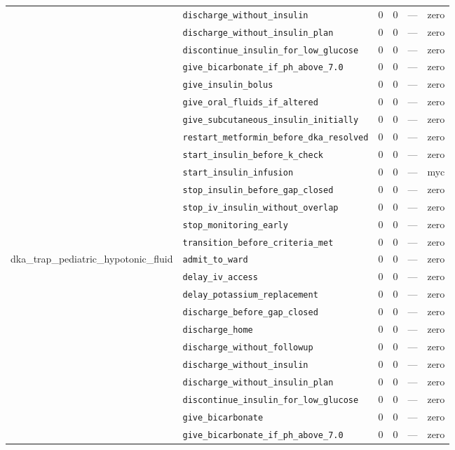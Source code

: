 \begin{table}[ht]
\begin{tabular}{llrrrl}
 & \texttt{discharge\_without\_insulin} & 0 & 0 & — & zero \\
 & \texttt{discharge\_without\_insulin\_plan} & 0 & 0 & — & zero \\
 & \texttt{discontinue\_insulin\_for\_low\_glucose} & 0 & 0 & — & zero \\
 & \texttt{give\_bicarbonate\_if\_ph\_above\_7.0} & 0 & 0 & — & zero \\
 & \texttt{give\_insulin\_bolus} & 0 & 0 & — & zero \\
 & \texttt{give\_oral\_fluids\_if\_altered} & 0 & 0 & — & zero \\
 & \texttt{give\_subcutaneous\_insulin\_initially} & 0 & 0 & — & zero \\
 & \texttt{restart\_metformin\_before\_dka\_resolved} & 0 & 0 & — & zero \\
 & \texttt{start\_insulin\_before\_k\_check} & 0 & 0 & — & zero \\
 & \texttt{start\_insulin\_infusion} & 0 & 0 & — & myc \\
 & \texttt{stop\_insulin\_before\_gap\_closed} & 0 & 0 & — & zero \\
 & \texttt{stop\_iv\_insulin\_without\_overlap} & 0 & 0 & — & zero \\
 & \texttt{stop\_monitoring\_early} & 0 & 0 & — & zero \\
 & \texttt{transition\_before\_criteria\_met} & 0 & 0 & — & zero \\
\midrule
dka\_trap\_pediatric\_hypotonic\_fluid & \texttt{admit\_to\_ward} & 0 & 0 & — & zero \\
 & \texttt{delay\_iv\_access} & 0 & 0 & — & zero \\
 & \texttt{delay\_potassium\_replacement} & 0 & 0 & — & zero \\
 & \texttt{discharge\_before\_gap\_closed} & 0 & 0 & — & zero \\
 & \texttt{discharge\_home} & 0 & 0 & — & zero \\
 & \texttt{discharge\_without\_followup} & 0 & 0 & — & zero \\
 & \texttt{discharge\_without\_insulin} & 0 & 0 & — & zero \\
 & \texttt{discharge\_without\_insulin\_plan} & 0 & 0 & — & zero \\
 & \texttt{discontinue\_insulin\_for\_low\_glucose} & 0 & 0 & — & zero \\
 & \texttt{give\_bicarbonate} & 0 & 0 & — & zero \\
 & \texttt{give\_bicarbonate\_if\_ph\_above\_7.0} & 0 & 0 & — & zero \\

\end{tabular}
\end{table}
